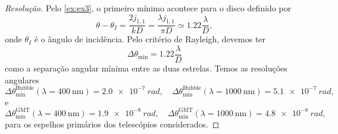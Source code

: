 \begin{proof}[Resolução]
    Pelo \cref{ex:ex3}, o primeiro mínimo acontece para o disco definido por
    \begin{equation*}
        \theta - \theta_I = \frac{2 j_{1,1}}{k D} = \frac{\lambda j_{1,1}}{\pi D} \simeq 1.22 \frac{\lambda}{D},
    \end{equation*}
    onde \(\theta_I\) é o ângulo de incidência. Pelo critério de Rayleigh, devemos ter 
    \begin{equation*}
        \Delta \theta_\mathrm{min} = 1.22\frac{\lambda}{D}
    \end{equation*}
    como a separação angular mínima entre as duas estrelas. Temos as resoluções angulares
    \begin{equation*}
        \Delta\theta_\mathrm{min}^\mathrm{Hubble}(\lambda = \SI{400}{\nano\meter}) = \SI{2.0e-7}{rad}, \quad
        \Delta\theta_\mathrm{min}^\mathrm{Hubble}(\lambda = \SI{1000}{\nano\meter}) = \SI{5.1e-7}{rad},
    \end{equation*}
    e
    \begin{equation*}
        \Delta\theta_\mathrm{min}^\mathrm{GMT}(\lambda = \SI{400}{\nano\meter}) = \SI{1.9e-8}{rad}, \quad
        \Delta\theta_\mathrm{min}^\mathrm{GMT}(\lambda = \SI{1000}{\nano\meter}) = \SI{4.8e-8}{rad},
    \end{equation*}
    para os espelhos primários dos telescópios considerados.
\end{proof}
